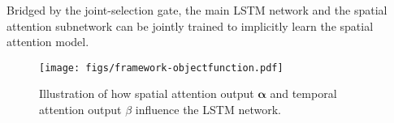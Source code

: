 \documentclass[letterpaper]{article}
\begin{document}
Bridged by the joint-selection gate, the main LSTM network and the spatial attention subnetwork can be jointly trained to implicitly learn the spatial attention model.



\begin{comment}
In this paper, we propose spatial attention model to automatically explore and exploit the importances of joints for each skeleton frame. With a soft attention mechanism, each joint within a frame is allocated to a spatial attention weight based on the soft joint-selection gates, which allows our model to focus more on those discriminative joints at each frame corresponding to that action. Thus, at each time step $t$, given the full set of $K$ joints within one frame $\bm{X}_t = \left( \bm{x}_{t,1}, ..., \mathbf{x}_{t,K} \right)$, the weighted input $\bm{X'}_t$ is computed:
\begin{equation}
\label{equ:spa_att_con}
  \bm{X'}_t = \bm{\alpha_t} \odot \bm{X}_t,
\end{equation}
where $\bm{\alpha}_t = [\alpha_{t,1}, \alpha_{t,2}, ..., \alpha_{t,K}]$ is the sequence of spatial attention weight, $\odot$ is element-wise multiplication. Considering the current skeleton context $\bm{X}_t$ and the memorized information from the hidden state $\bm{h}_{t-1}$ of the last time step, the weights can be computed as:
\begin{equation}
\label{equ:spa_att_1}
  \alpha_{t,i} = \frac{\exp(s_{t,i})}{\sum_{k=1} ^ K \exp(s_{t,k})},
\end{equation}

\begin{equation}
\label{equ:spa_att_2}
  \bm{s_t} = \mu ( \bm{X}_t, \bm{h}_{t-1}, \Theta_s),
\end{equation}
where $\Theta_s$ is jointly trained with all the other parameters of the neural network and $\bm{s}_t = [s_{t,1}, s_{t,2}, ..., s_{t,K}]$ is obtained through feed-forward layers. The spatial attention $\alpha_{t,i}$ represents the importance of $i_{th}$ joint $\bm{x}_{t,i}$, which can be thought of how active our model believes the joint is in the current frame at time $t$.
\end{comment}

\begin{figure}[t]
\begin{center}
		\texttt{[image: figs/framework-objectfunction.pdf]} \end{center}
	\vspace{-4mm}
	\caption{Illustration of how spatial attention output $\mathbf{\alpha}$ and temporal attention output $\beta$ influence the LSTM network.}
\label{fig:network}
	\vspace{1mm}
\end{figure}
\end{document}
